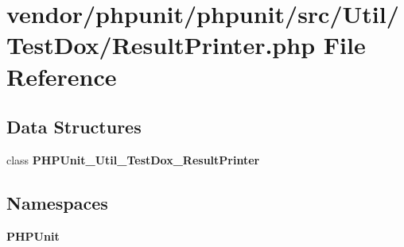 \section{vendor/phpunit/phpunit/src/\+Util/\+Test\+Dox/\+Result\+Printer.php File Reference}
\label{_util_2_test_dox_2_result_printer_8php}
\subsection*{Data Structures}
\begin{DoxyCompactItemize}
\item 
class {\bf P\+H\+P\+Unit\+\_\+\+Util\+\_\+\+Test\+Dox\+\_\+\+Result\+Printer}
\end{DoxyCompactItemize}
\subsection*{Namespaces}
\begin{DoxyCompactItemize}
\item 
 {\bf P\+H\+P\+Unit}
\end{DoxyCompactItemize}

